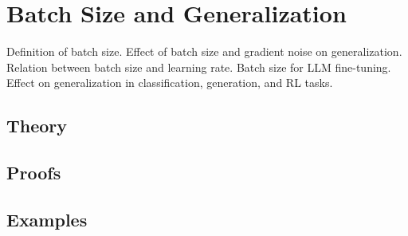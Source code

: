 
\section{Batch Size and Generalization}
\label{sec:2.5.02-batch-size}

\begin{ticket}
Definition of batch size. Effect of batch size and gradient noise on generalization. Relation between batch size and learning rate. Batch size for LLM fine-tuning. Effect on generalization in classification, generation, and RL tasks.
\end{ticket}

\subsection*{Theory}

\subsection*{Proofs}

\subsection*{Examples}
